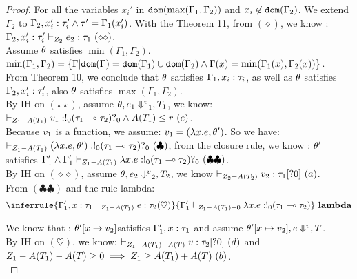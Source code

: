 \begin{proof}
   For all the variables $x_i' $ in $\mathtt{dom}(\max(\Gamma_1, \Gamma_2  )) $ and
   $x_i \not\in \mathtt{dom}(\Gamma_2)$. 
   We extend $\Gamma_2 $ to $\Gamma_2, x_i' : \tau_i' \land \tau'=\Gamma_1(x_i')$. With the
   Theorem 11, from $(\diamond)$, we know :\\
   $  \Gamma_2, x_i': \tau_i' \vdash_{Z_2} e_2: \tau_1 ~(\diamond\diamond)$.   \\

   Assume $\theta$ satisfies $\min(\Gamma_1, \Gamma_2)$. \\
   $ \min(\Gamma_1,\Gamma_2) = \{  \Gamma | \mathtt{dom}(\Gamma) = \mathtt{dom}(\Gamma_1)
   \cup \mathtt{dom}(\Gamma_2) \land    \Gamma(x) = \min(\Gamma_1(x),
   \Gamma_2(x) )   \} $. \\

  From Theorem 10, we conclude that $ \theta $ satisfies $ \Gamma_1, x_i
  : \tau_i $, as well as  $ \theta $ satisfies $ \Gamma_2, x_i'
  : \tau_i' $, also  $\theta$ satisfies $ \max(\Gamma_1, \Gamma_2)$.\\

  By IH on $(\star\star)$, assume $ \theta, e_1 \mathrel{\Downarrow^{v}}_1,
  T_1  $,  we know: $ \empty  \tvdash{\nnatA_1- A(\tr_1)} \valr_1:  \bang{0} ( \type_1
  \lto \type_2  )\whynot{0}  \land A(\tr_1) \leq r ~(e) $.\\
  Because $v_1$ is a function, we assume: $v_1 = ( \lambda
  x.e, \theta')$. So we have:  $ \empty \tvdash{\nnatA_1- A(\tr_1)} ( \lambda
  x.\expr, \env'):  \bang{0} ( \type_1
  \lto \type_2  )\whynot{0}  ~(\clubsuit)$, from the closure rule, we
  know : $\theta' $ satisfies $\Gamma_1' \land  \Gamma_1'  \vdash_{Z_1- A(T_1)}  \lambda
  x.e:  !_{0} ( \tau_1
  \multimap \tau_2  )?_{0}   ~(\clubsuit\clubsuit)$. \\

  By IH on $(\diamond\diamond)$, assume $\theta, e_2 \mathrel{\Downarrow^{v}}_2, T_2  $, we know $\empty
  \tvdash{\nnatA_2- A(\tr_2)} \valr_2: \type_1[?0]~(a)$. \\

  From $(\clubsuit \clubsuit )$ and the rule lambda:
  \[
    \inferrule{
        \Gamma_1' , x: \type_1
      \tvdash{ \nnatA_1- A(\tr_1) }
      \expr: \type_2 (\heartsuit)
    }{
       \Gamma_1' \tvdash{\nnatA_1- A(\tr_1) + 0} \lambda x. \expr : \bang{0} ( \type_1
  \lto \type_2  )
    }~\textbf{lambda}
  \]
  
 We know that : $ \theta'[x \to v_2] $satisfies $ \Gamma_1', x: \tau_1$ and
 assume $\theta'[ x \mapsto v_2], e \mathrel{\Downarrow^{v}}, T$.\\
By IH on $(\heartsuit)$, we know:  $ \empty \tvdash{\nnatA_1- A(\tr_1)
  - A(\tr)} \valr : \type_2[?0]~(d) $ and $ Z_1- A(T_1)
  - A(T) \geq 0 \implies Z_1 \geq A(T_1)
  + A(T)~ (b)$.\\


\end{proof}

